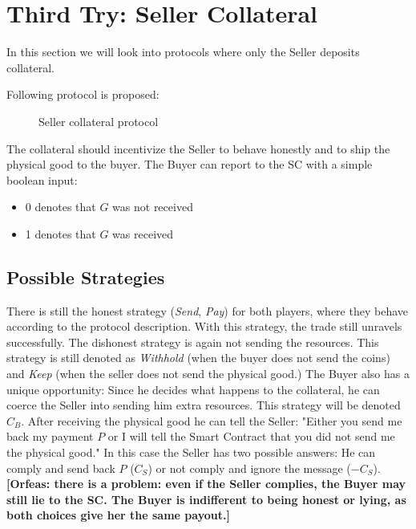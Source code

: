 \documentclass{cacthesis}
\newcommand{\authnote}[3]{{ \footnotesize \textbf{#1[#2: #3]~}}}
\newcommand{\orfnote}[1]{\authnote{\color{blue}}{Orfeas}{#1}}
\begin{document}
\section{Third Try: Seller Collateral}
\label{sec:seller-col}
In this section we will look into protocols where only the Seller deposits collateral.\newline

Following protocol is proposed:
\begin{figure}[htb!]
    \centering
    \caption{Seller collateral protocol}
    \label{pro:seller-col}
\end{figure}

The collateral should incentivize the Seller to behave honestly and to ship the
physical good to the buyer. The Buyer can report to the SC with a simple boolean input:
\begin{itemize}
    \item 0 denotes that $G$ was not received
    \item 1 denotes that $G$ was received
\end{itemize}
\subsection{Possible Strategies}
There is still the honest strategy (\emph{Send}, \emph{Pay}) for both players, where they behave according to the protocol description. With this strategy, the trade still unravels successfully.\newline
The dishonest strategy is again not sending the resources. This strategy is
still denoted as \emph{Withhold} (when the buyer does not send the coins) and \emph{Keep}
(when the seller does not send the physical good.)\newline
The Buyer also has a unique opportunity: Since he decides what happens to the
collateral, he can coerce the Seller into sending him extra resources. This
strategy will be denoted $C_B$.  After receiving the physical good he can tell
the Seller: "Either you send me back my payment $P$ or I will tell the Smart
Contract that you did not send me the physical good." In this case the Seller
has two possible answers: He can comply and send back $P$ ($C_S$) or not comply
and ignore the message ($-C_S$). \orfnote{there is a problem: even if the Seller
complies, the Buyer may still lie to the SC. The Buyer is indifferent to being
honest or lying, as both choices give her the same payout.}\newline
\end{document}
